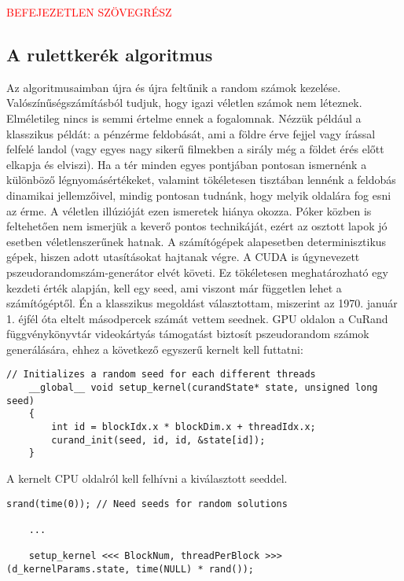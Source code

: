 \textcolor{red}{BEFEJEZETLEN SZÖVEGRÉSZ}

\subsection{A rulettkerék algoritmus \cite{alg_optim}}
Az algoritmusaimban újra és újra feltűnik a random számok kezelése. Valószínűségszámításból tudjuk, hogy igazi véletlen számok nem léteznek. Elméletileg nincs is semmi értelme ennek a fogalomnak. Nézzük például a klasszikus példát: a pénzérme feldobását, ami a földre érve fejjel vagy írással felfelé landol (vagy egyes nagy sikerű filmekben a sirály még a földet érés előtt elkapja és elviszi). Ha a tér minden egyes pontjában pontosan ismernénk a különböző légnyomásértékeket, valamint tökéletesen tisztában lennénk a feldobás dinamikai jellemzőivel, mindig pontosan tudnánk, hogy melyik oldalára fog esni az érme. A véletlen illúzióját ezen ismeretek hiánya okozza. Póker közben is feltehetően nem ismerjük a keverő pontos technikáját, ezért az osztott lapok jó esetben véletlenszerűnek hatnak. A számítógépek alapesetben determinisztikus gépek, hiszen adott utasításokat hajtanak végre. 
A CUDA is úgynevezett pszeudorandomszám-generátor elvét követi. Ez tökéletesen meghatározható egy kezdeti érték alapján, kell egy seed, ami viszont már független lehet a számítógéptől. Én a klasszikus megoldást választottam, miszerint az 1970. január 1. éjfél óta eltelt másodpercek számát vettem seednek.
GPU oldalon a CuRand függvénykönyvtár videokártyás támogatást biztosít pszeudorandom számok generálására, ehhez a következő egyszerű kernelt kell futtatni:

\begin{lstlisting}[style=CStyle]
	// Initializes a random seed for each different threads
	__global__ void setup_kernel(curandState* state, unsigned long seed)
	{
		int id = blockIdx.x * blockDim.x + threadIdx.x;
		curand_init(seed, id, id, &state[id]);
	}
\end{lstlisting}

A kernelt CPU oldalról kell felhívni a kiválasztott seeddel.

\begin{lstlisting}[style=CStyle]
	srand(time(0)); // Need seeds for random solutions
	
	...
	
	setup_kernel <<< BlockNum, threadPerBlock >>> (d_kernelParams.state, time(NULL) * rand());
\end{lstlisting}

\begin{lstlisting}[style=CStyle]
	
\end{lstlisting}


